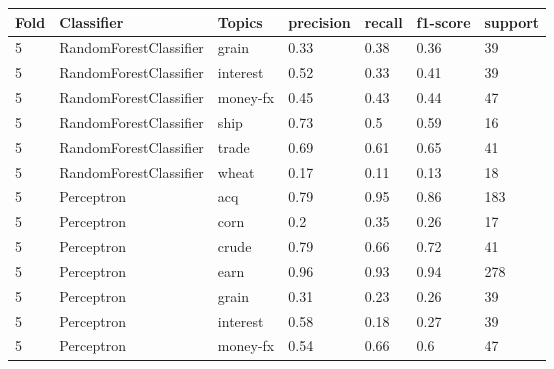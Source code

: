 \documentclass{article}
\begin{document}
\begin{table}[h]
\begin{tabular}{lllllll}
\textbf{Fold} & \textbf{Classifier}    & \textbf{Topics} & \textbf{precision} & \textbf{recall} & \textbf{f1-score} & \textbf{support} \\ \hline
5             & RandomForestClassifier & grain           & 0.33               & 0.38            & 0.36              & 39               \\
5             & RandomForestClassifier & interest        & 0.52               & 0.33            & 0.41              & 39               \\
5             & RandomForestClassifier & money-fx        & 0.45               & 0.43            & 0.44              & 47               \\
5             & RandomForestClassifier & ship            & 0.73               & 0.5             & 0.59              & 16               \\
5             & RandomForestClassifier & trade           & 0.69               & 0.61            & 0.65              & 41               \\
5             & RandomForestClassifier & wheat           & 0.17               & 0.11            & 0.13              & 18               \\
5             & Perceptron             & acq             & 0.79               & 0.95            & 0.86              & 183              \\
5             & Perceptron             & corn            & 0.2                & 0.35            & 0.26              & 17               \\
5             & Perceptron             & crude           & 0.79               & 0.66            & 0.72              & 41               \\
5             & Perceptron             & earn            & 0.96               & 0.93            & 0.94              & 278              \\
5             & Perceptron             & grain           & 0.31               & 0.23            & 0.26              & 39               \\
5             & Perceptron             & interest        & 0.58               & 0.18            & 0.27              & 39               \\
5             & Perceptron             & money-fx        & 0.54               & 0.66            & 0.6               & 47               \\

\end{tabular}
\end{table}
\end{document}
